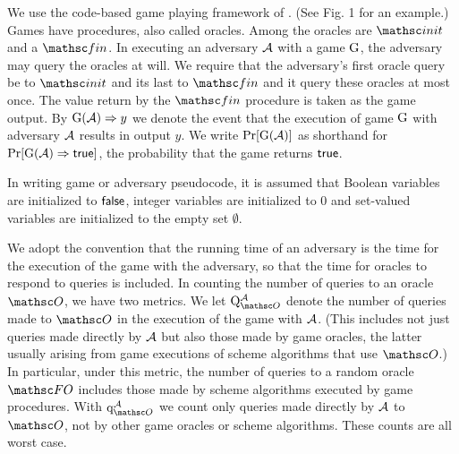  We use the code-based game playing framework of
\cite{EC:BelRog06}. (See Fig. 1 for an example.) Games have procedures, also called oracles. 
 Among the oracles are $\Initialize$ and a $\Finalize$. In executing an adversary $\mathcal{A}$ with a game $\textnormal{G}$, the adversary may query the oracles at will. We require that the adversary's first oracle query be to $\Initialize$ and its last to $\Finalize$ and it query these oracles at most once. The value return by the $\Finalize$ procedure is taken as the game output. By $\textnormal{G}(\mathcal{A}) \Rightarrow y$ we denote the event that the execution of game $\textnormal{G}$ with adversary $\mathcal{A}$ results in output $y$. We write $\Pr[\textnormal{G}(\mathcal{A})]$ as shorthand for $\Pr[\textnormal{G}(\mathcal{A})\Rightarrow \mathsf{true}]$, the probability that the game returns $\mathsf{true}$.

In writing game or adversary pseudocode, it is assumed that Boolean variables are initialized to $\mathsf{false}$, integer variables are initialized to $0$ and set-valued variables are initialized to the empty set $\emptyset$.


We adopt the convention that the running time of an adversary is the time for the execution of the game with the adversary, so that the time for oracles to respond to queries is included. In counting the number of queries to an oracle $\Oracle$, we have two metrics. We let $\Queries{\Oracle}{\advA}$ denote the number of queries made to $\Oracle$ in the execution of the game with $\mathcal{A}$. (This includes not just queries made directly by $\mathcal{A}$ but also those made by game oracles, the latter usually arising from game executions of scheme algorithms that use $\Oracle$.) In particular, under this metric, the number of queries to a random oracle $\HASH$ includes those made by scheme algorithms executed by game procedures. 
 With $\QueriesD{\Oracle}{\advA}$ we count only queries made directly by $\mathcal{A}$ to $\Oracle$, not by other game oracles or scheme algorithms.
These counts are all worst case.

